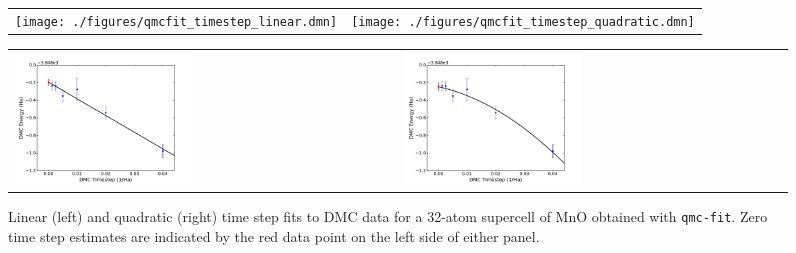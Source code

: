 \begin{figure}
  \centering
\ifdefined\HCode%
  \begin{tabularx}{1024pt}{X X}
    \texttt{[image: ./figures/qmcfit\_timestep\_linear.dmn]}&
    \texttt{[image: ./figures/qmcfit\_timestep\_quadratic.dmn]}\\
  \end{tabularx}
\else%
  \begin{tabularx}{\textwidth}{X X}
    \includegraphics[trim=0mm 0mm 4mm 0mm,clip,width=0.47\textwidth]{./figures/qmcfit_timestep_linear.pdf}&
    \includegraphics[trim=2mm 0mm 4mm 0mm,clip,width=0.47\textwidth]{./figures/qmcfit_timestep_quadratic.pdf}\\
    \end{tabularx}
\fi%
\caption{Linear (left) and quadratic (right) time step fits to DMC data for a 32-atom supercell of MnO obtained with \texttt{qmc-fit}.  Zero time step estimates are indicated by the red data point on the left side of either panel.}
  \label{fig:qmcfit_timestep}
\end{figure}

